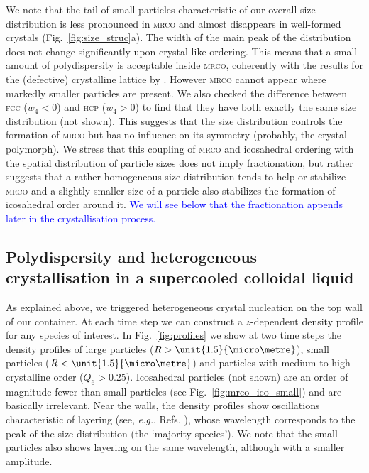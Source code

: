 \documentclass[8.5pt,twoside,twocolumn]{article}
\begin{document}
We note that the tail of small particles characteristic of our overall size distribution is less pronounced in \textsc{mrco} and almost disappears in well-formed crystals (Fig.~\ref{fig:size_struc}a). The width of the main peak of the distribution does not change significantly upon crystal-like ordering. This means that a small amount of polydispersity is acceptable inside \textsc{mrco}, coherently with the results for the (defective) crystalline lattice by \citet{Fasolo2003}. However \textsc{mrco} cannot appear where markedly smaller particles are present. We also checked the difference between \textsc{fcc} ($w_4<0$) and \textsc{hcp} ($w_4>0$) to find that they have both exactly the same size distribution (not shown). This suggests that the size distribution controls the formation of \textsc{mrco} but has no influence on its symmetry (probably, the crystal 
polymorph). 
We stress that this coupling of \textsc{mrco} and icosahedral ordering with the spatial distribution of particle sizes does not imply fractionation, but rather suggests
that a rather homogeneous size distribution tends to help or stabilize \textsc{mrco} and a slightly smaller size of a particle also stabilizes the formation of icosahedral order 
around it. \textcolor{blue}{We will see below that the fractionation appends later in the crystallisation process.}

\subsection{Polydispersity and heterogeneous crystallisation in a supercooled colloidal liquid}


As explained above, we triggered heterogeneous crystal nucleation on the top wall of our container. At each time step we can construct a $z$-dependent density profile for any species of interest. In Fig.~\ref{fig:profiles} we show at two time steps the density profiles of large particles ($R>\unit{1.5}{\micro\metre}$), small particles ($R<\unit{1.5}{\micro\metre}$) and particles with medium to high crystalline order ($Q_6>0.25$). Icosahedral particles (not shown) are an order of magnitude fewer than small particles (see Fig.~\ref{fig:mrco_ico_small}) and are basically irrelevant. Near the walls, the density profiles show oscillations characteristic of layering 
(see, \emph{e.g.}, Refs. \cite{watanabe2011,kob3}), whose wavelength corresponds to the peak of the size distribution (the `majority species'). We note that the small particles also shows layering on the same wavelength, although with a smaller amplitude.
\end{document}
